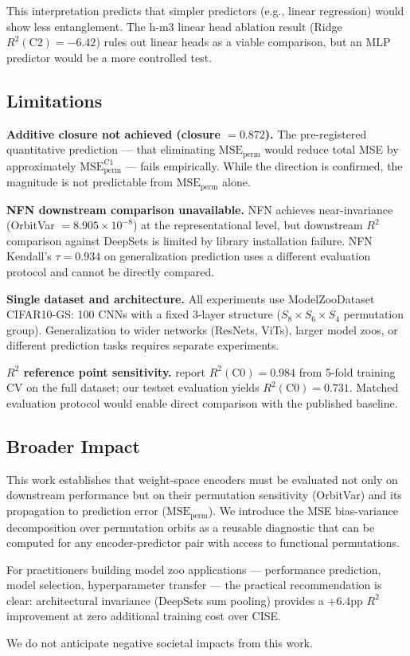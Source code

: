 This interpretation predicts that simpler predictors (e.g., linear regression) would show less entanglement. The h-m3 linear head ablation result (Ridge $R^2(\text{C2}) = -6.42$) rules out linear heads as a viable comparison, but an MLP predictor would be a more controlled test.

\subsection{Limitations}

\textbf{Additive closure not achieved (closure $= 0.872$).} The pre-registered quantitative prediction --- that eliminating $\text{MSE}_\text{perm}$ would reduce total MSE by approximately $\text{MSE}_\text{perm}^\text{C1}$ --- fails empirically. While the direction is confirmed, the magnitude is not predictable from $\text{MSE}_\text{perm}$ alone.

\textbf{NFN downstream comparison unavailable.} NFN achieves near-invariance (OrbitVar $= 8.905 \times 10^{-8}$) at the representational level, but downstream $R^2$ comparison against DeepSets is limited by library installation failure. NFN Kendall's $\tau = 0.934$ on generalization prediction \cite{Zhou2023Permutation} uses a different evaluation protocol and cannot be directly compared.

\textbf{Single dataset and architecture.} All experiments use ModelZooDataset CIFAR10-GS: 100 CNNs with a fixed 3-layer structure ($S_8 \times S_6 \times S_4$ permutation group). Generalization to wider networks (ResNets, ViTs), larger model zoos, or different prediction tasks requires separate experiments.

\textbf{$R^2$ reference point sensitivity.} \citet{Unterthiner2020Predicting} report $R^2(\text{C0}) = 0.984$ from 5-fold training CV on the full dataset; our testset evaluation yields $R^2(\text{C0}) = 0.731$. Matched evaluation protocol would enable direct comparison with the published baseline.

\subsection{Broader Impact}

This work establishes that weight-space encoders must be evaluated not only on downstream performance but on their permutation sensitivity (OrbitVar) and its propagation to prediction error ($\text{MSE}_\text{perm}$). We introduce the MSE bias-variance decomposition over permutation orbits as a reusable diagnostic that can be computed for any encoder-predictor pair with access to functional permutations.

For practitioners building model zoo applications --- performance prediction, model selection, hyperparameter transfer --- the practical recommendation is clear: architectural invariance (DeepSets sum pooling) provides a $+6.4$pp $R^2$ improvement at zero additional training cost over CISE.

We do not anticipate negative societal impacts from this work.
